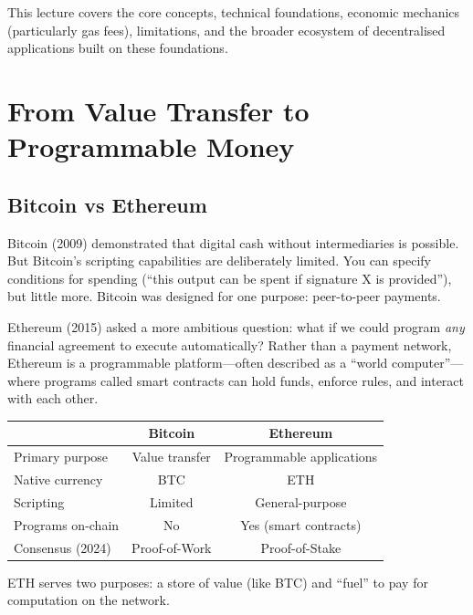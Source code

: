 \documentclass[11pt,a4paper]{article}
\begin{document}
This lecture covers the core concepts, technical foundations, economic mechanics (particularly gas fees), limitations, and the broader ecosystem of decentralised applications built on these foundations.

\section{From Value Transfer to Programmable Money}

\subsection{Bitcoin vs Ethereum}

Bitcoin (2009) demonstrated that digital cash without intermediaries is possible. But Bitcoin's scripting capabilities are deliberately limited. You can specify conditions for spending (``this output can be spent if signature X is provided''), but little more. Bitcoin was designed for one purpose: peer-to-peer payments.

Ethereum (2015) asked a more ambitious question: what if we could program \textit{any} financial agreement to execute automatically? Rather than a payment network, Ethereum is a programmable platform---often described as a ``world computer''---where programs called smart contracts can hold funds, enforce rules, and interact with each other.

\begin{center}
\begin{tabular}{lcc}
\toprule
& \textbf{Bitcoin} & \textbf{Ethereum} \\
\midrule
Primary purpose & Value transfer & Programmable applications \\
Native currency & BTC & ETH \\
Scripting & Limited & General-purpose \\
Programs on-chain & No & Yes (smart contracts) \\
Consensus (2024) & Proof-of-Work & Proof-of-Stake \\
\bottomrule
\end{tabular}
\end{center}

ETH serves two purposes: a store of value (like BTC) and ``fuel'' to pay for computation on the network.
\end{document}
